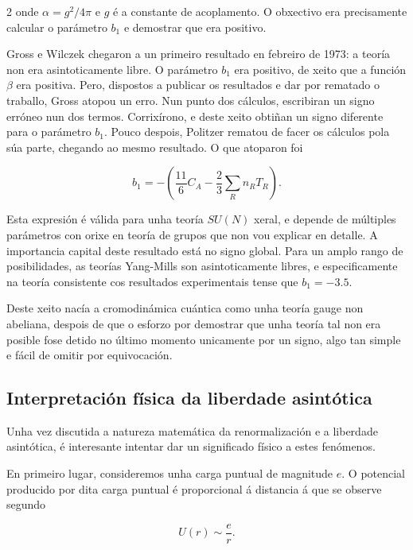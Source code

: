 \begin{multicols}{2}
\noindent onde $\alpha = g^2/4\pi$ e $g$ é a constante de acoplamento. O
obxectivo era precisamente calcular o parámetro $b_1$ e demostrar que era
positivo.

Gross e Wilczek chegaron a un primeiro resultado en febreiro de 1973: a teoría
non era asintoticamente libre. O parámetro $b_1$ era positivo, de xeito que a
función $\beta$ era positiva. Pero, dispostos a publicar os resultados e dar
por rematado o traballo, Gross atopou un erro. Nun punto dos cálculos,
escribiran un signo erróneo nun dos termos. Corrixírono, e deste xeito obtiñan
un signo diferente para o parámetro $b_1$. Pouco despois, Politzer rematou de
facer os cálculos pola súa parte, chegando ao mesmo resultado. O que atoparon
foi \cite{GrossWilczek, Politzer}

\begin{equation}
    b_1 = - \left(\frac{11}{6} C_A - \frac{2}{3} \sum_R n_R T_R \right).
\end{equation}

\noindent Esta expresión é válida para unha teoría $SU(N)$ xeral, e depende de
múltiples parámetros con orixe en teoría de grupos que non vou explicar en
detalle. A importancia capital deste resultado está no signo global. Para un
amplo rango de posibilidades, as teorías Yang-Mills son asintoticamente libres,
e especificamente na teoría consistente cos resultados experimentais tense que
$b_1 = -3.5$.

Deste xeito nacía a cromodinámica cuántica como unha teoría gauge non abeliana,
despois de que o esforzo por demostrar que unha teoría tal non era posible fose
detido no último momento unicamente por un signo, algo tan simple e fácil de
omitir por equivocación.

\subsection*{Interpretación física da liberdade asintótica}

Unha vez discutida a natureza matemática da renormalización e a liberdade
asintótica, é interesante intentar dar un significado físico a estes fenómenos.

En primeiro lugar, consideremos unha carga puntual de magnitude $e$. O
potencial producido por dita carga puntual é proporcional á distancia á que se
observe segundo

\begin{equation}
    U(r) \sim \frac{e}{r}.
\end{equation}


\end{multicols}
